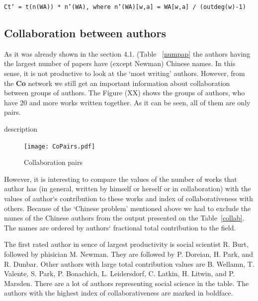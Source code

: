 \documentclass[11pt]{article} %
\begin{document}
\texttt{Ct` = t(n(WA)) * n’(WA), where n’(WA)[w,a] = WA[w,a] / (outdeg(w)-1)} 

\subsection{Collaboration between authors}  

As it was already shown in the section 4.1. (Table~ \ref{numpap} the authors having the largest number of papers have (except Newman) Chinese names. In this sense, it is not productive to look at the `most writing' authors. However, from the \textbf{Co} network we still get an important information about collaboration between groups of authors. The Figure (XX) shows the groups of authors, who have 20 and more works written together. As it can be seen, all of them are only pairs. \medskip  

description
\begin{figure}
\begin{center}
\texttt{[image: CoPairs.pdf]}
\end{center}
\caption{Collaboration pairs} \label{coPairs}
\end{figure}


However, it is interesting to compare the values of the number of works that author has (in general, written by himself or herself or in collaboration) with the values of author`s contribution to these works and index of collaborativeness with others. Because of the `Chinese problem'  mentioned above we had to exclude the names of the Chinese authors from the output presented on the Table~\ref{collab}.  The names are ordered by authors` fractional total contribution to the field.\medskip  
 
The first rated author in sence of largest productivity is social scientist R. Burt, followed by phisician M. Newman. They are followed by P. Doreian, H. Park, and R. Dunbar. Other authors with large total contribution values are B. Wellamn, T. Valente, S. Park, P. Bonachich, L. Leidersdorf, C. Latkin, H. Litwin, and P. Marsden. There are a lot of authors representing social science in the table. The authors with the highest index of collaborativeness are marked in boldface. \medskip 
\end{document}
